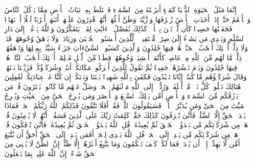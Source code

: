 \startbuffer[\q:10:24]
إِنَّمَا مَثَلُ ٱلۡحَیَوٰةِ ٱلدُّنۡیَا كَمَاۤءٍ أَنزَلۡنَٰهُ مِنَ ٱلسَّمَاۤءِ فَٱخۡتَلَطَ بِهِۦ نَبَاتُ ٱلۡأَرۡضِ مِمَّا یَأۡكُلُ ٱلنَّاسُ وَٱلۡأَنۡعَٰمُ حَتَّىٰۤ إِذَاۤ أَخَذَتِ ٱلۡأَرۡضُ زُخۡرُفَهَا وَٱزَّیَّنَتۡ وَظَنَّ أَهۡلُهَاۤ أَنَّهُمۡ قَٰدِرُونَ عَلَیۡهَاۤ أَتَىٰهَاۤ أَمۡرُنَا لَیۡلًا أَوۡ نَهَارࣰا فَجَعَلۡنَٰهَا حَصِیدࣰا كَأَن لَّمۡ تَغۡنَ بِٱلۡأَمۡسِۚ كَذَٰلِكَ نُفَصِّلُ ٱلۡءَایَٰتِ لِقَوۡمࣲ یَتَفَكَّرُونَ%
\stopbuffer%
\startbuffer[\q:10:25]
وَٱللَّهُ یَدۡعُوۤا۟ إِلَىٰ دَارِ ٱلسَّلَٰمِ وَیَهۡدِی مَن یَشَاۤءُ إِلَىٰ صِرَٰطࣲ مُّسۡتَقِیمࣲ%
\stopbuffer%
\startbuffer[\q:10:26]
۞ لِّلَّذِینَ أَحۡسَنُوا۟ ٱلۡحُسۡنَىٰ وَزِیَادَةࣱۖ وَلَا یَرۡهَقُ وُجُوهَهُمۡ قَتَرࣱ وَلَا ذِلَّةٌۚ أُو۟لَٰۤئِكَ أَصۡحَٰبُ ٱلۡجَنَّةِۖ هُمۡ فِیهَا خَٰلِدُونَ%
\stopbuffer%
\startbuffer[\q:10:27]
وَٱلَّذِینَ كَسَبُوا۟ ٱلسَّیِّءَاتِ جَزَاۤءُ سَیِّئَةِۭ بِمِثۡلِهَا وَتَرۡهَقُهُمۡ ذِلَّةࣱۖ مَّا لَهُم مِّنَ ٱللَّهِ مِنۡ عَاصِمࣲۖ كَأَنَّمَاۤ أُغۡشِیَتۡ وُجُوهُهُمۡ قِطَعࣰا مِّنَ ٱلَّیۡلِ مُظۡلِمًاۚ أُو۟لَٰۤئِكَ أَصۡحَٰبُ ٱلنَّارِۖ هُمۡ فِیهَا خَٰلِدُونَ%
\stopbuffer%
\startbuffer[\q:10:28]
وَیَوۡمَ نَحۡشُرُهُمۡ جَمِیعࣰا ثُمَّ نَقُولُ لِلَّذِینَ أَشۡرَكُوا۟ مَكَانَكُمۡ أَنتُمۡ وَشُرَكَاۤؤُكُمۡۚ فَزَیَّلۡنَا بَیۡنَهُمۡۖ وَقَالَ شُرَكَاۤؤُهُم مَّا كُنتُمۡ إِیَّانَا تَعۡبُدُونَ%
\stopbuffer%
\startbuffer[\q:10:29]
فَكَفَىٰ بِٱللَّهِ شَهِیدَۢا بَیۡنَنَا وَبَیۡنَكُمۡ إِن كُنَّا عَنۡ عِبَادَتِكُمۡ لَغَٰفِلِینَ%
\stopbuffer%
\startbuffer[\q:10:30]
هُنَالِكَ تَبۡلُوا۟ كُلُّ نَفۡسࣲ مَّاۤ أَسۡلَفَتۡۚ وَرُدُّوۤا۟ إِلَى ٱللَّهِ مَوۡلَىٰهُمُ ٱلۡحَقِّۖ وَضَلَّ عَنۡهُم مَّا كَانُوا۟ یَفۡتَرُونَ%
\stopbuffer%
\startbuffer[\q:10:31]
قُلۡ مَن یَرۡزُقُكُم مِّنَ ٱلسَّمَاۤءِ وَٱلۡأَرۡضِ أَمَّن یَمۡلِكُ ٱلسَّمۡعَ وَٱلۡأَبۡصَٰرَ وَمَن یُخۡرِجُ ٱلۡحَیَّ مِنَ ٱلۡمَیِّتِ وَیُخۡرِجُ ٱلۡمَیِّتَ مِنَ ٱلۡحَیِّ وَمَن یُدَبِّرُ ٱلۡأَمۡرَۚ فَسَیَقُولُونَ ٱللَّهُۚ فَقُلۡ أَفَلَا تَتَّقُونَ%
\stopbuffer%
\startbuffer[\q:10:32]
فَذَٰلِكُمُ ٱللَّهُ رَبُّكُمُ ٱلۡحَقُّۖ فَمَاذَا بَعۡدَ ٱلۡحَقِّ إِلَّا ٱلضَّلَٰلُۖ فَأَنَّىٰ تُصۡرَفُونَ%
\stopbuffer%
\startbuffer[\q:10:33]
كَذَٰلِكَ حَقَّتۡ كَلِمَتُ رَبِّكَ عَلَى ٱلَّذِینَ فَسَقُوۤا۟ أَنَّهُمۡ لَا یُؤۡمِنُونَ%
\stopbuffer%
\startbuffer[\q:10:34]
قُلۡ هَلۡ مِن شُرَكَاۤئِكُم مَّن یَبۡدَؤُا۟ ٱلۡخَلۡقَ ثُمَّ یُعِیدُهُۥۚ قُلِ ٱللَّهُ یَبۡدَؤُا۟ ٱلۡخَلۡقَ ثُمَّ یُعِیدُهُۥۖ فَأَنَّىٰ تُؤۡفَكُونَ%
\stopbuffer%
\startbuffer[\q:10:35]
قُلۡ هَلۡ مِن شُرَكَاۤئِكُم مَّن یَهۡدِیۤ إِلَى ٱلۡحَقِّۚ قُلِ ٱللَّهُ یَهۡدِی لِلۡحَقِّۗ أَفَمَن یَهۡدِیۤ إِلَى ٱلۡحَقِّ أَحَقُّ أَن یُتَّبَعَ أَمَّن لَّا یَهِدِّیۤ إِلَّاۤ أَن یُهۡدَىٰۖ فَمَا لَكُمۡ كَیۡفَ تَحۡكُمُونَ%
\stopbuffer%
\startbuffer[\q:10:36]
وَمَا یَتَّبِعُ أَكۡثَرُهُمۡ إِلَّا ظَنًّاۚ إِنَّ ٱلظَّنَّ لَا یُغۡنِی مِنَ ٱلۡحَقِّ شَیۡءًاۚ إِنَّ ٱللَّهَ عَلِیمُۢ بِمَا یَفۡعَلُونَ%
\stopbuffer%
